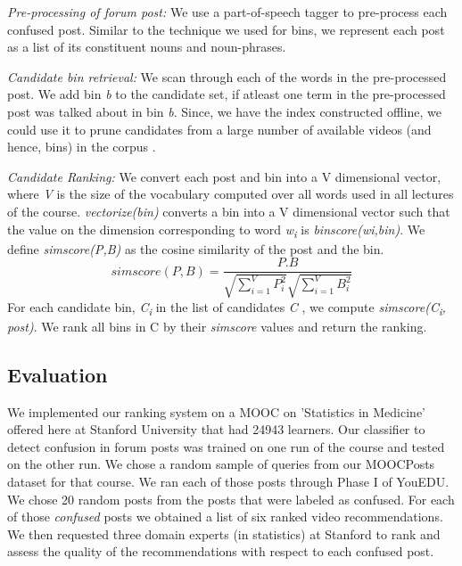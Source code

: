 \documentclass{edm_template}
\begin{document}
\textit{Pre-processing of forum post:} 
We use a part-of-speech tagger \cite{nltk} to pre-process each confused post. Similar to the technique we used for bins, we represent each post as a list of its constituent nouns and noun-phrases. 

\textit{Candidate bin retrieval:}
We scan through each of the words in the pre-processed post. We add bin \textit{b} to the candidate set, if atleast one term in the pre-processed post was talked about in bin \textit{b}. Since, we have the index constructed offline, we could use it to prune candidates from a large number of available videos (and hence, bins) in the corpus .

\textit{Candidate Ranking:}
We convert each post and bin into a V dimensional vector, where \textit{V} is the size of the vocabulary computed over all words used in all lectures of the course. \textit{vectorize(bin)} converts a bin into a V dimensional vector such that the value on the dimension corresponding to word  \textit{w\textsubscript i} is \textit{binscore(wi,bin)}. We define \textit{simscore(P,B)} as the cosine similarity of the post and the bin.
\begin{equation}
simscore(P,B) = \frac{P.B}{\sqrt{\sum\limits_{i=1}^V P_i ^2} \sqrt{\sum\limits_{i=1}^V B_i ^2}  }
\end{equation}
For each candidate bin, \textit{C\textsubscript i} in the list of candidates \textit{C} , we compute \textit{simscore(C\textsubscript i, post)}. We rank all bins in C by their \textit{simscore} values and return the ranking.

\subsection{Evaluation}

We implemented our ranking system on a MOOC on 'Statistics in Medicine' offered here at Stanford University that had 24943 learners. Our classifier to detect confusion in forum posts was trained on one run of the course and tested on the other run. We chose a random sample of queries from our MOOCPosts dataset for that course. We ran each of those posts through Phase I of YouEDU. We chose 20 random posts from the posts that were labeled as confused. For each of those \textit{confused} posts we obtained a list of six ranked video recommendations. We then requested  three domain experts (in statistics) at Stanford to rank and assess the quality of the recommendations with respect to each confused post.
\end{document}
